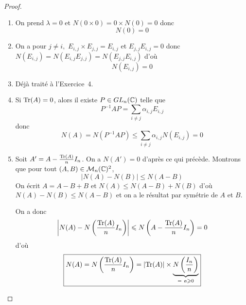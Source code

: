 \documentclass[12pt]{article}
\begin{document}
\begin{proof}
    \phantom{}
    \begin{enumerate}
        \item On prend $\lambda=0$ et $N(0\times 0)=0\times N(0)=0$ donc 
        \begin{equation}
            \boxed{N(0)=0}
        \end{equation}

        \item On a pour $j\neq i,$ $E_{i,j}\times E_{j,j}=E_{i,j}$ et $E_{j,j}E_{i,j}=0$ donc $N(E_{i,j})=N(E_{i,j}E_{j,j})=N(E_{j,j}E_{i,j})$ d'où 
        \begin{equation}
            \boxed{N(E_{i,j})=0}
        \end{equation}

        \item Déjà traité à l'Exercice~4.
        
        \item Si $\operatorname{Tr}(A)=0$, alors il existe $P\in GL_{n}(\mathbb{C})$ telle que 
        \begin{equation}
            P^{-1}AP=\sum_{i\neq j}\alpha_{i,j}E_{i,j}
        \end{equation}
        donc 
        \begin{equation}
            \boxed{N(A)=N(P^{-1}AP)\leqslant\sum_{i\neq j}\alpha_{i,j}N(E_{i,j})=0}
        \end{equation}

        \item Soit $A'=A-\frac{\operatorname{Tr}(A)}{n}I_{n}$. On a $N(A')=0$ d'après ce qui précède. Montrons que pour tout $(A,B)\in\mathcal{M}_{n}(\mathbb{C})^{2}$,
        \begin{equation}
            \left\lvert N(A)-N(B)\right\rvert\leqslant N(A-B)
        \end{equation}
        On écrit $A=A-B+B$ et $N(A)\leqslant N(A-B)+N(B)$ d'où $N(A)-N(B)\leqslant N(A-B)$ et on a le résultat par symétrie de $A$ et $B$.

        On a donc 
        \begin{equation}
            \left\lvert N(A)-N\left(\frac{\operatorname{Tr}(A)}{n}I_{n}\right)\right\rvert\leqslant N\left(A-\frac{\operatorname{Tr}(A)}{n}I_{n}\right)=0
        \end{equation}
        d'où 
        \begin{equation}
            \boxed{N(A)=N\left(\frac{\operatorname{Tr}(A)}{n}I_{n}\right)=\left\lvert\operatorname{Tr}(A)\right\rvert\times \underbrace{N\left(\frac{I_{n}}{n}\right)}_{=~a\geqslant0}}
        \end{equation}
    \end{enumerate}
\end{proof}
\end{document}
